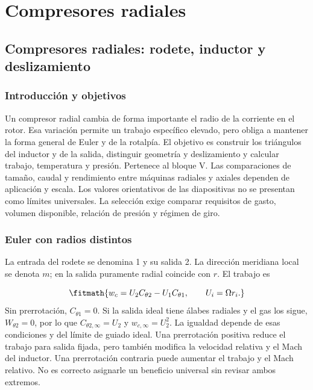 \documentclass[10pt,openany]{book}
\begin{document}
\studiumchaptercheck

\part{Compresores radiales}

\chapter{Compresores radiales: rodete, inductor y deslizamiento}
\label{chap:c15}


\section{Introducción y objetivos}

Un compresor radial cambia de forma importante el radio de la corriente en el rotor. Esa variación permite un trabajo específico elevado, pero obliga a mantener la forma general de Euler y de la rotalpía. El objetivo es construir los triángulos del inductor y de la salida, distinguir geometría y deslizamiento y calcular trabajo, temperatura y presión. Pertenece al bloque V.
Las comparaciones de tamaño, caudal y rendimiento entre máquinas radiales y axiales dependen de aplicación y escala. Los valores orientativos de las diapositivas no se presentan como límites universales. La selección exige comparar requisitos de gasto, volumen disponible, relación de presión y régimen de giro.

\section{Euler con radios distintos}

La entrada del rodete se denomina 1 y su salida 2. La dirección meridiana local se denota \(m\); en la salida puramente radial coincide con \(r\). El trabajo es

\[
\fitmath{w_c=U_2C_{\theta2}-U_1C_{\theta1},\qquad U_i=\Omega r_i.}
\]
Sin prerrotación, \(C_{\theta1}=0\). Si la salida ideal tiene álabes radiales y el gas los sigue, \(W_{\theta2}=0\), por lo que \(C_{\theta2,\infty}=U_2\) y \(w_{c,\infty}=U_2^2\). La igualdad depende de esas condiciones y del límite de guiado ideal.
Una prerrotación positiva reduce el trabajo para salida fijada, pero también modifica la velocidad relativa y el Mach del inductor. Una prerrotación contraria puede aumentar el trabajo y el Mach relativo. No es correcto asignarle un beneficio universal sin revisar ambos extremos.
\end{document}
